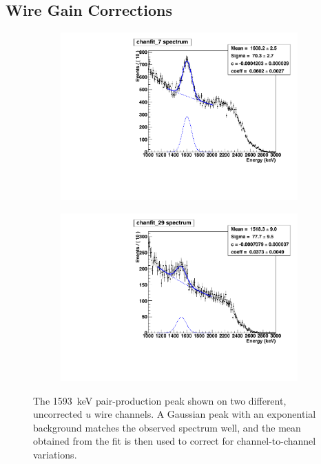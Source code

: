 \documentclass[herrin-thesis.tex]{subfiles}
\begin{document}
\subsection{Wire Gain Corrections}
\begin{figure}
	\begin{subfigure}[t]{0.48\textwidth}
		\centering
		\includegraphics[width=\textwidth]{./plots/data_wiregain_pp07.pdf}
	\end{subfigure}\hfill%
	\begin{subfigure}[t]{0.48\textwidth}
		\centering
		\includegraphics[width=\textwidth]{./plots/data_wiregain_pp29.pdf}
	\end{subfigure}
	\caption[The pair-production peak on individual \(u\) wire channels]{The \SI{1593}{\keV} pair-production peak shown on two different, uncorrected \(u\) wire channels. A Gaussian peak with an exponential background matches the observed spectrum well, and the mean obtained from the fit is then used to correct for channel-to-channel variations.}
	\label{fig:data_wiregain_pp}
\end{figure}
\end{document}
